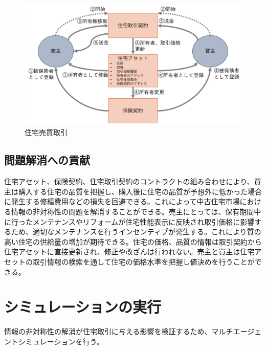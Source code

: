 \documentclass[a4paper,fontsize=11pt,report,notitlepage,line_length=38zw,number_of_lines=40,dvipdfmx]{jlreq}
\begin{document}
\begin{figure}
 \centering
 \includegraphics[width=12cm]{spa.png}
 \caption{住宅売買取引}
 \label{spa}
\end{figure}

\section{問題解消への貢献}
住宅アセット、保険契約、住宅取引契約のコントラクトの組み合わせにより、買主は購入する住宅の品質を把握し、購入後に住宅の品質が予想外に低かった場合に発生する修繕費用などの損失を回避できる。これによって中古住宅市場における情報の非対称性の問題を解消することができる。売主にとっては、保有期間中に行ったメンテナンスやリフォームが住宅性能表示に反映され取引価格に影響するため、適切なメンテナンスを行うインセンティブが発生する。これにより質の高い住宅の供給量の増加が期待できる。住宅の価格、品質の情報は取引契約から住宅アセットに直接更新され、修正や改ざんは行われない。売主と買主は住宅アセットの取引情報の検索を通して住宅の価格水準を把握し値決めを行うことができる。

\chapter{シミュレーションの実行}
情報の非対称性の解消が住宅取引に与える影響を検証するため、マルチエージェントシミュレーションを行う。
\end{document}
